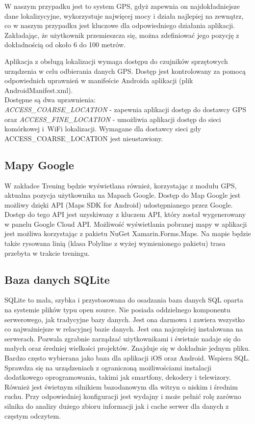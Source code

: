W naszym przypadku jest to system GPS, gdyż zapewnia on najdokładniejsze dane lokalizycyjne, wykorzystuje najwięcej mocy i działa najlepiej na zewnątrz, co w naszym przypadku jest kluczowe dla odpowiedniego działania aplikacji. Zakładając, że użytkownik przemieszcza się, można zdefiniować jego pozycję z dokładnością od około 6 do 100 metrów.

Aplikacja z obsługą lokalizacji wymaga dostępu do czujników sprzętowych urządzenia w celu odbierania danych GPS. Dostęp jest kontrolowany za pomocą odpowiednich uprawnień w manifeście Androida aplikacji (plik AndroidManifest.xml). \\ Dostępne są dwa uprawnienia: \\ \textit{ACCESS\_COARSE\_LOCATION} - zapewnia aplikacji dostęp do dostawcy GPS oraz \textit{ACCESS\_FINE\_LOCATION} - umożliwia aplikacji dostęp do sieci komórkowej i~WiFi lokalizacji. Wymagane dla dostawcy sieci gdy ACCESS\_COARSE\_LOCATION jest nieustawiony.

\subsection{Mapy Google}  %

\hspace{0.60cm}W zakładce Trening będzie wyświetlana również, korzystając z modułu GPS, aktualna pozycja użytkownika na Mapach Google. Dostęp do Map Google jest możliwy dzięki API (Maps SDK for Android) udostępnianego przez Google. Dostęp do tego API jest uzyskiwany z kluczem API, który został wygenerowany w panelu Google Cloud API. Możliwość wyświetlania pobranej mapy w aplikacji jest możliwa korzystając z pakietu NuGet Xamarin.Forms.Maps. Na mapie będzie także rysowana linią (klasa Polyline z wyżej wymienionego pakietu) trasa przebyta w trakcie treningu. 

\subsection{Baza danych SQLite} %

\hspace{0.60cm}SQLite to mała, szybka i przystosowana do osadzania baza danych SQL oparta na systemie plików typu open source. Nie posiada oddzielnego komponentu serwerowego, jak tradycyjne bazy danych. Jest ona darmowa i zawiera wszystko co najważniejsze w relacyjnej bazie danych. Jest ona najczęściej instalowana na serwerach. Pozwala zgrabnie zarządzać użytkownikami i świetnie nadaje się do małych oraz średniej wielkości projektów. Znajduje się w dokładnie jednym pliku. Bardzo często wybierana jako baza dla aplikacji iOS oraz Android. Wspiera SQL. Sprawdza się na urządzeniach z ograniczoną możliwościami instalacji dodatkowego oprogramowania, takimi jak smartfony, dekodery i telewizory. Również jest świetnym silnikiem bazodanowym dla witryn o niskim i średnim ruchu. Przy odpowiedniej konfiguracji jest wydajny i może pełnić rolę zarówno silnika do analizy dużego zbioru informacji jak i cache serwer dla danych z częstym odczytem.


